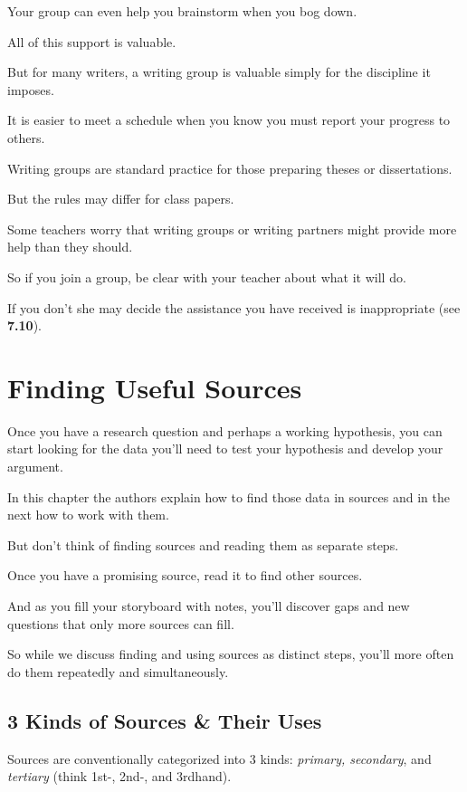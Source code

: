\documentclass[oneside]{book}
\numberwithin{equation}{section}
\begin{document}
Your group can even help you brainstorm when you bog down.

All of this support is valuable.

But for many writers, a writing group is valuable simply for the discipline it imposes.

It is easier to meet a schedule when you know you must report your progress to others.

%
Writing groups are standard practice for those preparing theses or dissertations.

But the rules may differ for class papers.

Some teachers worry that writing groups or writing partners might provide more help than they should.

So if you join a group, be clear with your teacher about what it will do.

If you don't she may decide the assistance you have received is inappropriate (see \textbf{7.10}).


\chapter{Finding Useful Sources}

Once you have a research question and perhaps a working hypothesis, you can start looking for the data you'll need to test your hypothesis and develop your argument.

In this chapter the authors explain how to find those data in sources and in the next how to work with them.

But don't think of finding sources and reading them as separate steps.

Once you have a promising source, read it to find other sources.

And as you fill your storyboard with notes, you'll discover gaps and new questions that only more sources can fill.

So while we discuss finding and using sources as distinct steps, you'll more often do them repeatedly and simultaneously.

\section{3 Kinds of Sources \& Their Uses}
Sources are conventionally categorized into 3 kinds: \textit{primary, secondary}, and \textit{tertiary} (think 1st-, 2nd-, and 3rdhand).
\end{document}
